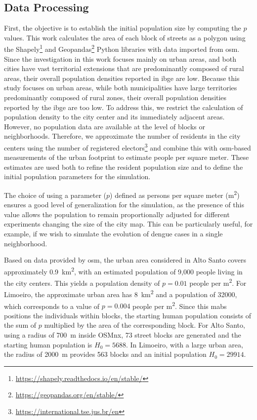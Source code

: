 \subsection{Data Processing}\label{subsec:data-processing}

First, the objective is to establish the initial population size by computing the $p$ values.
This work calculates the area of each block of streets as a polygon using the Shapely\footnote{\url{https://shapely.readthedocs.io/en/stable/}} and Geopandas\footnote{\url{https://geopandas.org/en/stable/}} Python libraries with data imported from \gls{osm}. Since the investigation in this work focuses mainly on urban areas, and both cities have vast territorial extensions that are predominantly composed of rural areas, their overall population densities reported in \gls{ibge} are low. 
Because this study focuses on urban areas, while both municipalities have large territories predominantly composed of rural zones, their overall population densities reported by the \gls{ibge} are too low. To address this, we restrict the calculation of population density to the city center and its immediately adjacent areas. However, no population data are available at the level of blocks or neighborhoods. Therefore, we approximate the number of residents in the city centers using the number of registered electors\footnote{\url{https://international.tse.jus.br/en}} and combine this with \gls{osm}-based measurements of the urban footprint to estimate people per square meter. These estimates are used both to refine the resident population size and to define the initial population parameters for the simulation.

The choice of using a parameter ($p$) defined as persons per square meter (m\textsuperscript{2}) ensures a good level of generalization for the simulation, as the presence of this value allows the population to remain proportionally adjusted for different experiments changing the size of the city map. This can be particularly useful, for example, if we wish to simulate the evolution of dengue cases in a single neighborhood.

Based on data provided by \gls{osm}, the urban area considered in Alto Santo covers approximately 0.9~km\textsuperscript{2}, with an estimated population of 9,000 people living in the city centers. This yields a population density of $p = 0.01$ people per m\textsuperscript{2}. For Limoeiro, the approximate urban area has 8~km\textsuperscript{2} and a population of 32000, which corresponds to a value of \( p = 0.004 \) people per m\textsuperscript{2}. Since this \gls{mabs} positions the individuals within blocks, the starting human population consists of the sum of $p$ multiplied by the area of the corresponding block. For Alto Santo, using a radius of 700~m inside OSMnx, 73 street blocks are generated and the starting human population is $H_0 = 5688$. In Limoeiro, with a large urban area, the radius of 2000~m provides 563 blocks and an initial population $H_0 = 29914$. 

